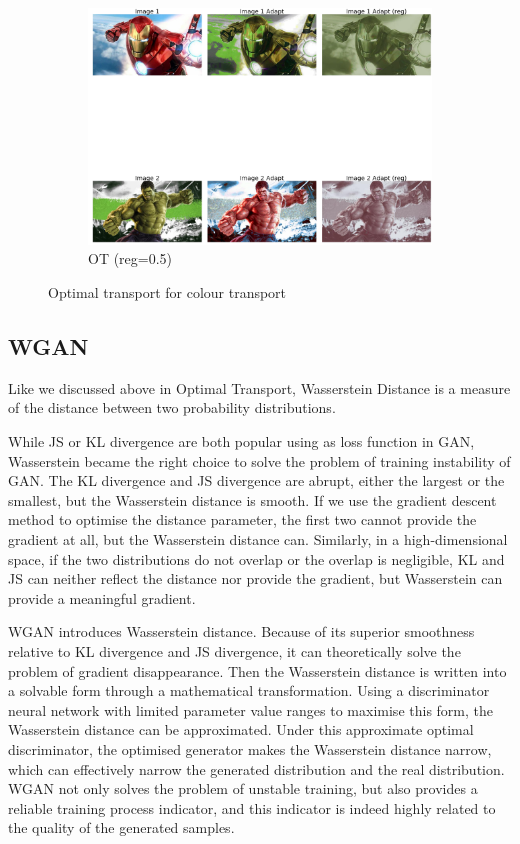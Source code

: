 \documentclass{article}
\begin{document}
\begin{figure}[h!]
\begin{subfigure}[b]{0.3\textwidth}
         \includegraphics[width=\textwidth]{lab4/ot0.5-min.pdf}
         \caption{OT (reg=0.5)}
         \label{fig:ot0.5}
     \end{subfigure}
        \caption{Optimal transport for colour transport}
        \label{fig:ot}
\end{figure}

\subsection{WGAN}

Like we discussed above in Optimal Transport, Wasserstein Distance is a measure of the distance between two probability distributions. 

While JS or KL divergence are both popular using as loss function in GAN, Wasserstein became the right choice to solve the problem of training instability of GAN. The KL divergence and JS divergence are abrupt, either the largest or the smallest, but the Wasserstein distance is smooth. If we use the gradient descent method to optimise the distance parameter, the first two cannot provide the gradient at all, but the Wasserstein distance can. Similarly, in a high-dimensional space, if the two distributions do not overlap or the overlap is negligible, KL and JS can neither reflect the distance nor provide the gradient, but Wasserstein can provide a meaningful gradient.

WGAN introduces Wasserstein distance. Because of its superior smoothness relative to KL divergence and JS divergence, it can theoretically solve the problem of gradient disappearance. Then the Wasserstein distance is written into a solvable form through a mathematical transformation. Using a discriminator neural network with limited parameter value ranges to maximise this form, the Wasserstein distance can be approximated. Under this approximate optimal discriminator, the optimised generator makes the Wasserstein distance narrow, which can effectively narrow the generated distribution and the real distribution. WGAN not only solves the problem of unstable training, but also provides a reliable training process indicator, and this indicator is indeed highly related to the quality of the generated samples.
\end{document}

